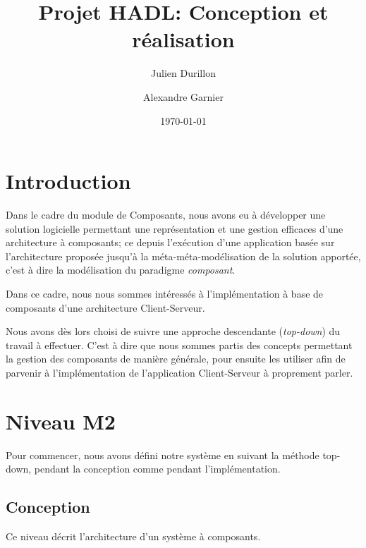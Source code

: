 \documentclass[french,a4paper,titlepage]{article}
\title{Projet HADL: Conception et réalisation}
\author{Julien Durillon \and Alexandre Garnier}
\date{\today}
\begin{document}
	\maketitle

	\tableofcontents\clearpage
	
	\section*{Introduction}

	  Dans le cadre du module de Composants, nous avons eu à développer une
	  solution logicielle permettant une représentation et une gestion efficaces
	  d'une architecture à composants; ce depuis l'exécution d'une application
	  basée sur l'architecture proposée jusqu'à la méta-méta-modélisation de la
	  solution apportée, c'est à dire la modélisation du paradigme
	  \emph{composant}.

    Dans ce cadre, nous nous sommes intéressés à l'implémentation à base de
    composants d'une architecture Client-Serveur.
    
    Nous avons dès lors choisi de suivre une approche descendante
    (\emph{top-down}) du travail à effectuer. C'est à dire que nous sommes
    partis des concepts permettant la gestion des composants de manière
    générale, pour ensuite les utiliser afin de parvenir à l'implémentation de
    l'application Client-Serveur à proprement parler.

	\section{Niveau M2}
	
		Pour commencer, nous avons défini notre système en suivant la méthode top-down, pendant la conception comme pendant l'implémentation.
	
		\subsection{Conception}
		\normalfont
			Ce niveau décrit l'architecture d'un système à composants.
		
\end{document}
